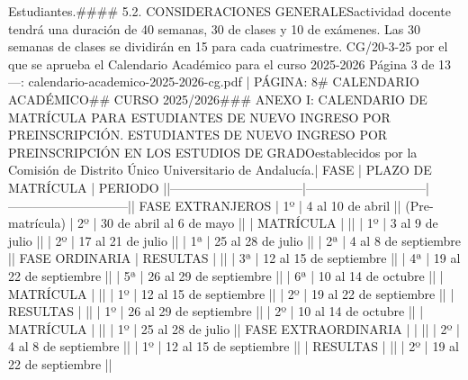 \documentclass{article}
\begin{document}
\begin{itemize}
{Estudiantes.\n\n#### 5.2. CONSIDERACIONES GENERALES\n\nLa actividad docente tendrá una duración de 40 semanas, 30 de clases y 10 de exámenes. Las 30 semanas de clases se dividirán en 15 para cada cuatrimestre.\n{} CG/20-3-25 por el que se aprueba el Calendario Académico para el curso 2025-2026  Página 3 de 13\n\n---\n\nFUENTE: calendario-academico-2025-2026-cg.pdf | PÁGINA: 8\n# CALENDARIO ACADÉMICO\n## CURSO 2025/2026\n\n### ANEXO I: CALENDARIO DE MATRÍCULA PARA ESTUDIANTES DE NUEVO INGRESO POR PREINSCRIPCIÓN\n{}. ESTUDIANTES DE NUEVO INGRESO POR PREINSCRIPCIÓN EN LOS ESTUDIOS DE GRADO\n\nPlazos establecidos por la Comisión de Distrito Único Universitario de Andalucía.\n\n| FASE                           | PLAZO DE MATRÍCULA          | PERIODO                     |\n|--------------------------------|-----------------------------|-----------------------------|\n| FASE EXTRANJEROS              | 1º                          | 4 al 10 de abril            |\n| (Pre-matrícula)               | 2º                          | 30 de abril al 6 de mayo    |\n|                                | MATRÍCULA                   |                             |\n|                                | 1º                          | 3 al 9 de julio             |\n|                                | 2º                          | 17 al 21 de julio           |\n|                                | 1ª                          | 25 al 28 de julio           |\n|                                | 2ª                          | 4 al 8 de septiembre        |\n| FASE ORDINARIA                | RESULTAS                    |                             |\n|                                | 3ª                          | 12 al 15 de septiembre       |\n|                                | 4ª                          | 19 al 22 de septiembre       |\n|                                | 5ª                          | 26 al 29 de septiembre       |\n|                                | 6ª                          | 10 al 14 de octubre         |\n|                                | MATRÍCULA                   |                             |\n|                                | 1º                          | 12 al 15 de septiembre       |\n|                                | 2º                          | 19 al 22 de septiembre       |\n|                                | RESULTAS                    |                             |\n|                                | 1º                          | 26 al 29 de septiembre       |\n|                                | 2º                          | 10 al 14 de octubre         |\n|                                | MATRÍCULA                   |                             |\n|                                | 1º                          | 25 al 28 de julio           |\n| FASE EXTRAORDINARIA           |                             |                             |\n|                                | 2º                          | 4 al 8 de septiembre        |\n|                                | 1º                          | 12 al 15 de septiembre       |\n|                                | RESULTAS                    |                             |\n|                                | 2º                          | 19 al 22 de septiembre       |\n|                            }
\end{itemize}
\end{document}
